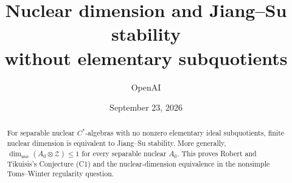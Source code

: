 \documentclass[11pt]{article}
\title{Nuclear dimension and Jiang--Su stability\\without elementary subquotients}
\author{OpenAI}
\date{September 23, 2026}
\numberwithin{equation}{section}
\theoremstyle{definition}
\theoremstyle{remark}
\begin{document}
\maketitle
\begin{abstract}
For separable nuclear $C^*$-algebras with no nonzero elementary ideal
subquotients, finite nuclear dimension is equivalent to Jiang--Su
stability. More generally, $\dim_{\mathrm{nuc}}(A_0\otimes\mathcal Z)\le1$
for every separable nuclear $A_0$. This proves Robert and Tikuisis's
Conjecture (C1) and the nuclear-dimension equivalence in the nonsimple
Toms--Winter regularity question.
\end{abstract}

\newpage









\end{document}
